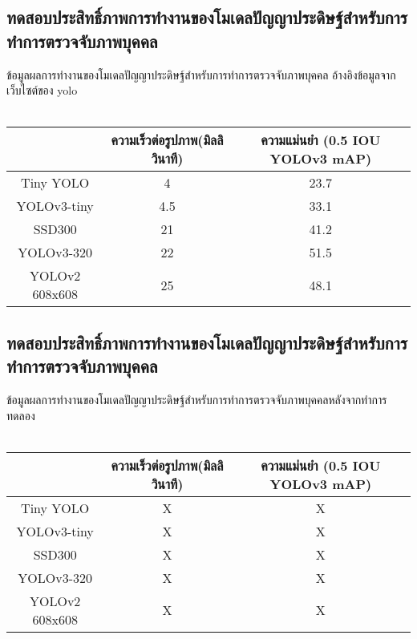 
\subsection{ทดสอบประสิทธิ์ภาพการทำงานของโมเดลปัญญาประดิษฐ์สำหรับการทำการตรวจจับภาพบุคคล}
 ข้อมูลผลการทำงานของโมเดลปัญญาประดิษฐ์สำหรับการทำการตรวจจับภาพบุคคล อ้างอิงข้อมูลจากเว็บไซต์ของ yolo			\\
\\
\begin{tabular}{|c|c|c|}
		\hline
		{}&{ความเร็วต่อรูปภาพ(มิลลิวินาที)}&{ความแม่นยำ (0.5 IOU YOLOv3 mAP)}			\\
		\hline
		Tiny YOLO	 				& 4				& 23.7														\\
		YOLOv3-tiny				& 4.5				& 33.1				\\
		SSD300					& 21				& 41.2				\\
		YOLOv3-320				& 22				& 51.5				\\	
		YOLOv2 608x608			& 25				& 48.1				\\
	\hline
\end{tabular}

\subsection{ทดสอบประสิทธิ์ภาพการทำงานของโมเดลปัญญาประดิษฐ์สำหรับการทำการตรวจจับภาพบุคคล}
ข้อมูลผลการทำงานของโมเดลปัญญาประดิษฐ์สำหรับการทำการตรวจจับภาพบุคคลหลังจากทำการทดลอง
\\\\
\begin{tabular}{|c|c|c|}
		\hline 
		{}&{ความเร็วต่อรูปภาพ(มิลลิวินาที)}&{ความแม่นยำ (0.5 IOU YOLOv3 mAP)}			\\
		\hline
		Tiny YOLO	 				& X				& X 														\\
		YOLOv3-tiny				& X				& X				\\
		SSD300					& X				& X				\\
		YOLOv3-320				& X				& X				\\	
		YOLOv2 608x608			& X				& X				\\
	\hline
\end{tabular}
		